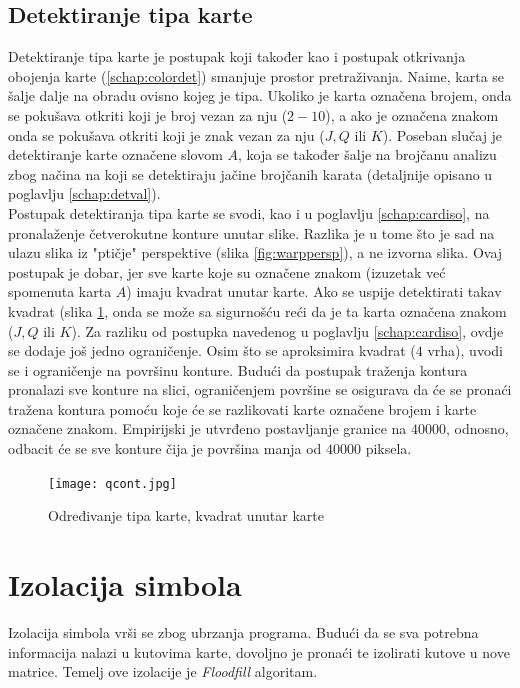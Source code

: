 \documentclass[times, zavrsni, numeric, utf8]{fer}
\begin{document}
\subsection{Detektiranje tipa karte}
\label{schap:typedet}
\hspace*{0.5cm}Detektiranje tipa karte je postupak koji također kao i postupak otkrivanja obojenja karte (\ref{schap:colordet}) smanjuje prostor pretraživanja. Naime, karta se šalje dalje na obradu ovisno kojeg je tipa. Ukoliko je karta označena brojem, onda se pokušava otkriti koji je broj vezan za nju ($2 - 10$), a ako je označena znakom onda se pokušava otkriti koji je znak vezan za nju ($J, Q$ ili $K$). Poseban slučaj je detektiranje karte označene slovom $A$, koja se također šalje na brojčanu analizu zbog načina na koji se detektiraju jačine brojčanih karata (detaljnije opisano u poglavlju \ref{schap:detval}). \\
Postupak detektiranja tipa karte se svodi, kao i u poglavlju \ref{schap:cardiso}, na pronalaženje četverokutne konture unutar slike. Razlika je u tome što je sad na ulazu slika iz "ptičje" perspektive (slika \ref{fig:warppersp}), a ne izvorna slika. Ovaj postupak je dobar, jer sve karte koje su označene znakom (izuzetak već spomenuta karta $A$) imaju kvadrat unutar karte. Ako se uspije detektirati takav kvadrat (slika \ref{fig:queenconts}, onda se može sa sigurnošću reći da je ta karta označena znakom ($J, Q$ ili $K$). Za razliku od postupka navedenog u poglavlju \ref{schap:cardiso}, ovdje se dodaje još jedno ograničenje. Osim što se aproksimira kvadrat ($4$ vrha), uvodi se i ograničenje na površinu konture. Budući da postupak traženja kontura pronalazi sve konture na slici, ograničenjem površine se osigurava da će se pronaći tražena kontura pomoću koje će se razlikovati karte označene brojem i karte označene znakom. Empirijski je utvrđeno postavljanje granice na $40000$, odnosno, odbacit će se sve konture čija je površina manja od $40000$ piksela. 
\begin{figure}[H]
\centering
\texttt{[image: qcont.jpg]}
\caption{Određivanje tipa karte, kvadrat unutar karte}
\label{fig:queenconts}
\end{figure}
\section{Izolacija simbola}
\label{schap:symiso}
\hspace*{0.5cm}Izolacija simbola vrši se zbog ubrzanja programa. Budući da se sva potrebna informacija nalazi u kutovima karte, dovoljno je pronaći te izolirati kutove u nove matrice. Temelj ove izolacije je \textit{Floodfill} algoritam.
\end{document}
